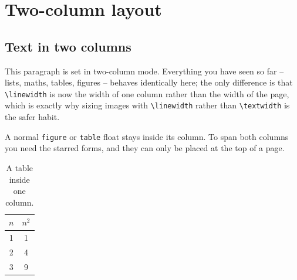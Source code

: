 \documentclass[11pt,a4paper]{article}
\theoremstyle{definition}                   %
\begin{document}


\section{Two-column layout}
%
%

\twocolumn

\subsection{Text in two columns}
This paragraph is set in two-column mode. Everything you have seen so far --
lists, maths, tables, figures -- behaves identically here; the only difference
is that \verb|\linewidth| is now the width of one column rather than the width
of the page, which is exactly why sizing images with \verb|\linewidth| rather
than \verb|\textwidth| is the safer habit.

A normal \texttt{figure} or \texttt{table} float stays inside its column. To
span both columns you need the starred forms, and they can only be placed at
the top of a page.

\begin{table}[H]
    \centering
    \caption{A table inside one column.}
    \label{tab:incolumn}
    \begin{tabular}{|c|c|}
        \hline
        $n$ & $n^2$ \\ \hline
        1 & 1 \\ \hline
        2 & 4 \\ \hline
        3 & 9 \\ \hline
    \end{tabular}
\end{table}
\end{document}
